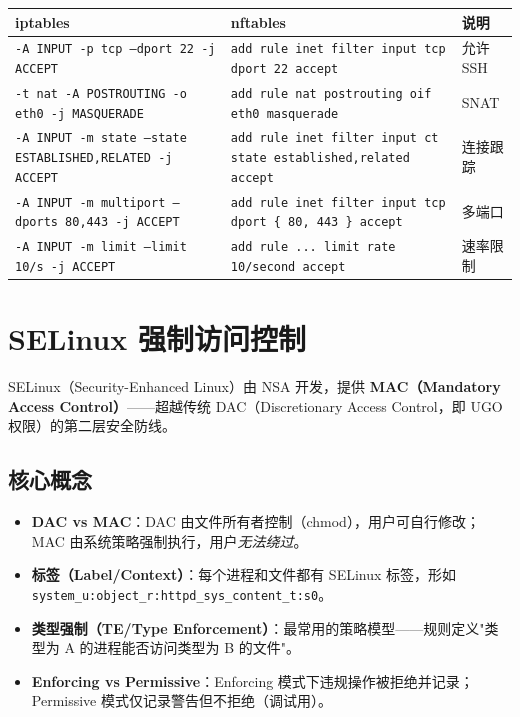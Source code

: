 \documentclass[12pt,UTF8]{ctexbook}
\begin{document}
\begin{tabular}{|p{4.5cm}|p{5cm}|p{3cm}|}
\hline
\textbf{iptables} & \textbf{nftables} & \textbf{说明} \\
\hline
\texttt{-A INPUT -p tcp --dport 22 -j ACCEPT} & \texttt{add rule inet filter input tcp dport 22 accept} & 允许 SSH \\
\hline
\texttt{-t nat -A POSTROUTING -o eth0 -j MASQUERADE} & \texttt{add rule nat postrouting oif eth0 masquerade} & SNAT \\
\hline
\texttt{-A INPUT -m state --state ESTABLISHED,RELATED -j ACCEPT} & \texttt{add rule inet filter input ct state established,related accept} & 连接跟踪 \\
\hline
\texttt{-A INPUT -m multiport --dports 80,443 -j ACCEPT} & \texttt{add rule inet filter input tcp dport \{ 80, 443 \} accept} & 多端口 \\
\hline
\texttt{-A INPUT -m limit --limit 10/s -j ACCEPT} & \texttt{add rule ... limit rate 10/second accept} & 速率限制 \\
\hline
\end{tabular}

\section{SELinux 强制访问控制}
\label{sec:selinux-deep}

SELinux（Security-Enhanced Linux）由 NSA 开发，提供 \textbf{MAC（Mandatory Access Control）}——超越传统 DAC（Discretionary Access Control，即 UGO 权限）的第二层安全防线。

\subsection{核心概念}

\begin{itemize}
    \item \textbf{DAC vs MAC}：DAC 由文件所有者控制（chmod），用户可自行修改；MAC 由系统策略强制执行，用户\emph{无法绕过}。
    \item \textbf{标签（Label/Context）}：每个进程和文件都有 SELinux 标签，形如 \texttt{system\_u:object\_r:httpd\_sys\_content\_t:s0}。
    \item \textbf{类型强制（TE/Type Enforcement）}：最常用的策略模型——规则定义"类型为 A 的进程能否访问类型为 B 的文件"。
    \item \textbf{Enforcing vs Permissive}：Enforcing 模式下违规操作被拒绝并记录；Permissive 模式仅记录警告但不拒绝（调试用）。
\end{itemize}
\end{document}
